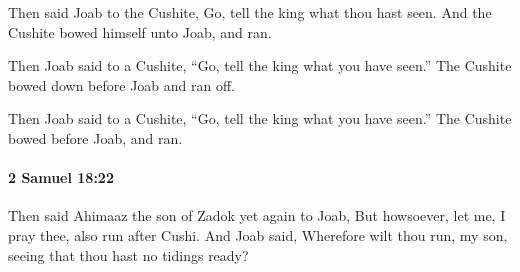 			\begin{versebox}
					\item[BHS] 
					\item[ASV] Then said Joab to the Cushite, Go, tell the king what thou hast seen. And the Cushite bowed himself unto Joab, and ran.
					\item[NIV] Then Joab said to a Cushite, “Go, tell the king what you have seen.” The Cushite bowed down before Joab and ran off.
					\item[NRSV] Then Joab said to a Cushite, “Go, tell the king what you have seen.” The Cushite bowed before Joab, and ran.
			\end{versebox}

		\paragraph{2 Samuel 18:22} %
			\label{2SAMUEL-18-22}

			Then said Ahimaaz the son of Zadok yet again to Joab, But howsoever, let me, I pray thee, also run after Cushi. And Joab said, Wherefore wilt thou run, my son, seeing that thou hast no tidings ready?

